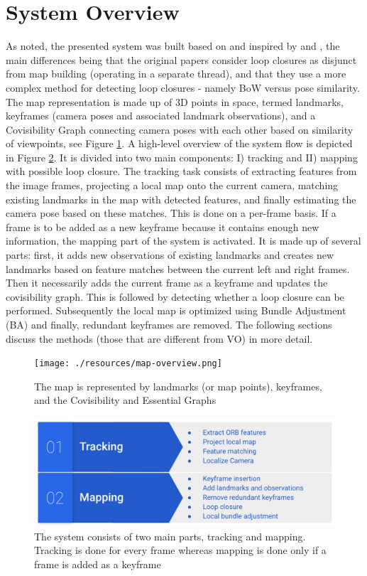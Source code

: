 \documentclass[a4paper, 10pt]{article}
\begin{document}
\section{System Overview}
\label{sec:orgb35b778}
As noted, the presented system was built based on and inspired by \cite{os} and \cite{os-II},
the main differences being that the original papers consider loop closures as disjunct from map building (operating in a separate thread), and that they use a more complex method for detecting loop closures - namely BoW versus pose similarity. 
The map representation is made up of 3D points in space, termed landmarks, keyframes (camera poses and associated landmark observations), and a Covisibility Graph connecting camera poses with each other based on 
similarity of viewpoints, see Figure \ref{fig:org80ff381}.
A high-level overview of the system flow is depicted in Figure \ref{fig:orgd992e0a}. It is divided into two main components: I) tracking and II) mapping with possible loop closure.
The tracking task consists of extracting features from the image frames, projecting a local map onto the current camera, matching existing landmarks in the map with detected features, 
and finally estimating the camera pose based on these matches.
This is done on a per-frame basis. If a frame is to be added as a new keyframe because it contains enough new information, the mapping part of the system is activated.
It is made up of several parts: first, it adds new observations of existing landmarks and creates new landmarks based on feature matches between the current left and right frames.
Then it necessarily adds the current frame as a keyframe and updates the covisibility graph. This is followed by detecting whether a loop closure can be performed.
Subsequently the local map is optimized using Bundle Adjustment (BA) \cite{ba} and finally, redundant keyframes are removed. The following sections discuss the methods (those that are different from VO) in more detail.

\begin{figure}[htbp]
\centering
\texttt{[image: ./resources/map-overview.png]}
\caption{\label{fig:org80ff381}
The map is represented by landmarks (or map points), keyframes, and the Covisibility and Essential Graphs}
\end{figure}

\begin{figure}[htbp]
\centering
\includegraphics[width=0.7\linewidth]{./resources/system.jpeg}
\caption{\label{fig:orgd992e0a}
The system consists of two main parts, tracking and mapping. Tracking is done for every frame whereas mapping is done only if a frame is added as a keyframe}
\end{figure}
\end{document}

